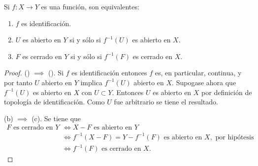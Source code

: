 

\begin{theorem}
Si $f : X \longrightarrow Y$ es una función, son equivalentes:
\begin{enumerate}[label=\textnormal{(\roman*)}]
\item $f$ es identificación.
\item $U$ es abierto en $Y$ si y sólo si $f^{-1}(U)$ es abierto en $X$.
\item $F$ es cerrado en $Y$ si y sólo si $f^{-1}(F)$ es cerrado en $X$.
\end{enumerate}
\end{theorem}

\begin{proof}
({\scshape{}}) $\implies$ ({\scshape{}}).  Si $f$ es identificación entonces $f$ es, en particular, continua, y por tanto $U$ abierto en $Y$ implica $f^{-1}(U)$ abierto en $X$. Supogase ahora que $f^{-1}(U)$ es abierto en $X$ con $U \subset Y$. Entonces $U$ es abierto en $X$ por definición de topología de identificación. Como $U$ fue arbitrario se tiene el resultado.
\bigskip

(b) $\implies$ (c). Se tiene que
\begin{align*}
    F \text{ es cerrado en } Y & \iff X - F \text{ es abierto en } Y \\
                               & \iff f^{-1}(X - F) = Y-f^{-1}(F) \text{ es abierto en } X, \text{ por hipótesis} \\
                               & \iff f^{-1}(F) \text{ es cerrado en } X.
\end{align*}
\end{proof}
